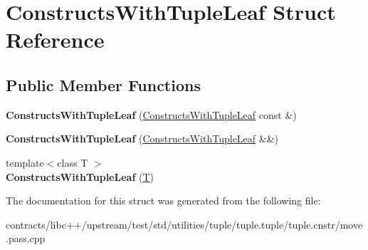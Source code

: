 \hypertarget{struct_constructs_with_tuple_leaf}{}\section{Constructs\+With\+Tuple\+Leaf Struct Reference}
\label{struct_constructs_with_tuple_leaf}
\subsection*{Public Member Functions}
\begin{DoxyCompactItemize}
\item 
\mbox{\label{struct_constructs_with_tuple_leaf_a836a044fc104727e2d8da4cf05d74585}} 
{\bfseries Constructs\+With\+Tuple\+Leaf} (\mbox{\hyperlink{struct_constructs_with_tuple_leaf}{Constructs\+With\+Tuple\+Leaf}} const \&)
\item 
\mbox{\label{struct_constructs_with_tuple_leaf_aa880705571dcd748e2e0a9e9bbcfff31}} 
{\bfseries Constructs\+With\+Tuple\+Leaf} (\mbox{\hyperlink{struct_constructs_with_tuple_leaf}{Constructs\+With\+Tuple\+Leaf}} \&\&)
\item 
\mbox{\label{struct_constructs_with_tuple_leaf_a900edbeffbab8301b7a6022cd7d123f9}} 
{\footnotesize template$<$class T $>$ }\\{\bfseries Constructs\+With\+Tuple\+Leaf} (\mbox{\hyperlink{struct_t}{T}})
\end{DoxyCompactItemize}


The documentation for this struct was generated from the following file\+:\begin{DoxyCompactItemize}
\item 
contracts/libc++/upstream/test/std/utilities/tuple/tuple.\+tuple/tuple.\+cnstr/move.\+pass.\+cpp\end{DoxyCompactItemize}
